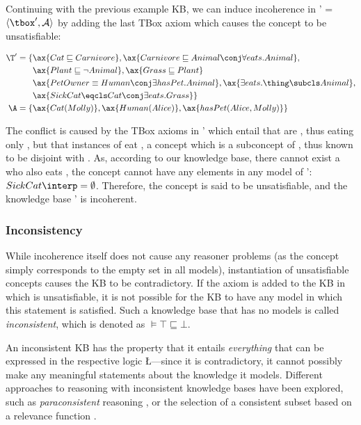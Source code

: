 Continuing with the previous example KB, we can induce incoherence in \K' = $\langle \tbox', \mathcal{A}\rangle$  by adding the last TBox axiom which causes the concept  to be  unsatisfiable:
\begin{examp}
\begin{align*}
		\T' = \{&\ax{Cat \sqsubseteq Carnivore}, \ax{Carnivore \sqsubseteq Animal \conj \forall eats.Animal},\\ 
		& \ax{Plant \sqsubseteq \lnot Animal}, \ax{Grass \sqsubseteq Plant} \\ 
		& \ax{PetOwner \equiv Human\conj \exists hasPet.Animal}, \ax{\exists eats.\thing \subcls Animal}, \\
		& \ax{SickCat \eqcls Cat \conj \exists eats.Grass}\}\\
		\A = \{& \ax{Cat(Molly)},\ax{Human(Alice)},\ax{hasPet(Alice, Molly)}\}
	\end{align*}
\end{examp}
The conflict is caused by the TBox axioms in \K' which entail that  are , thus eating only , but that instances of  eat , a concept which is a subconcept of , thus known to be disjoint with .  As, according to our knowledge base, there cannot exist a  who also eats , the concept  cannot have any elements in any model \I of \K': $SickCat\interp = \emptyset$. Therefore, the concept  is said to be unsatisfiable, and the knowledge base \K' is incoherent.

\subsubsection{Inconsistency}
While incoherence itself does not cause any reasoner problems (as the concept simply corresponds to the empty set in all models), instantiation of unsatisfiable concepts causes the KB to be contradictory. If the axiom  is added to the KB in which  is unsatisfiable, it is not possible for the KB to have any model in which this statement is satisfied. Such a knowledge base that has no models is called \emph{inconsistent}, which is denoted as \K $\models \top \sqsubseteq \bot$. 

An inconsistent KB has the property that it entails \emph{everything} that can be expressed in the respective logic \L---since it is contradictory, it cannot possibly make any meaningful statements about the knowledge it models. Different approaches to reasoning with inconsistent knowledge bases have been explored, such as \emph{paraconsistent} reasoning \cite{ma07yl}, or the selection of a consistent subset based on a relevance function \cite{huang05du}. 


